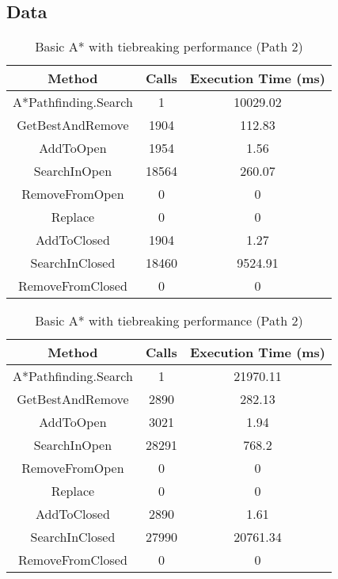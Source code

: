 \documentclass{article}
\begin{document}
  \subsection{Data}
  \begin{table}[h!]
      \parbox{.45\linewidth}{
        \centering
        \caption{Basic A* with tiebreaking performance (Path 1)}
        \label{tab:tableTieBreaking1}
        \begin{tabular}{c|c|c}
          \textbf{Method} & \textbf{Calls} & \textbf{Execution Time (ms)}\\
          \hline
          A*Pathfinding.Search  & 1 & 10029.02\\
          GetBestAndRemove & 1904 & 112.83\\
          AddToOpen & 1954 & 1.56\\
          SearchInOpen & 18564 & 260.07\\
          RemoveFromOpen & 0 & 0\\
          Replace & 0 & 0\\
          AddToClosed & 1904 & 1.27\\
          SearchInClosed & 18460 & 9524.91\\
          RemoveFromClosed & 0 & 0\\
        \end{tabular}
      }
      \hfil
      \parbox{.45\linewidth}{
        \centering
        \label{tab:tableTieBreaking2}
        \caption{Basic A* with tiebreaking performance (Path 2)}
        \begin{tabular}{c|c|c}
          \textbf{Method} & \textbf{Calls} & \textbf{Execution Time (ms)}\\
          \hline
          A*Pathfinding.Search  & 1 & 21970.11\\
          GetBestAndRemove & 2890 & 282.13\\
          AddToOpen & 3021 & 1.94\\
          SearchInOpen & 28291 & 768.2\\
          RemoveFromOpen & 0 & 0\\
          Replace & 0 & 0\\
          AddToClosed & 2890 & 1.61\\
          SearchInClosed & 27990  & 20761.34\\
          RemoveFromClosed & 0 & 0\\
        \end{tabular}
      }
  \end{table}
\end{document}
